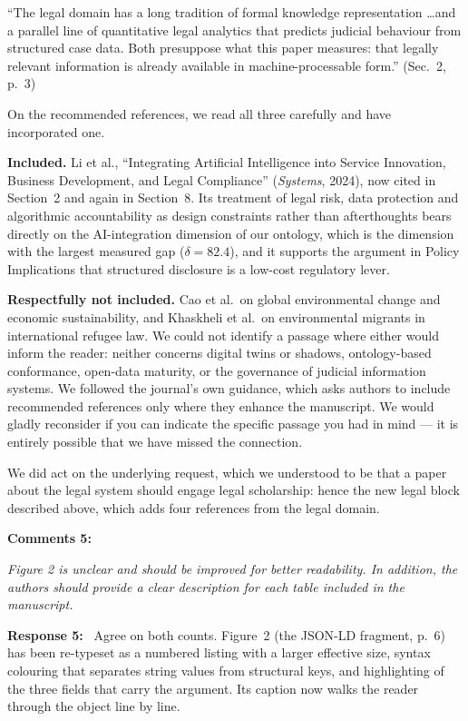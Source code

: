 \documentclass[10pt,a4paper]{article}
\newcommand{\rev}[1]{\textcolor{revred}{#1}}
\newenvironment{revcomment}
  {\begin{mdframed}[backgroundcolor=cmtbg, linecolor=cmtrule, linewidth=0.5pt,
     innertopmargin=5pt, innerbottommargin=5pt, innerleftmargin=7pt,
     innerrightmargin=7pt, skipabove=5pt, skipbelow=5pt]\small\itshape}
  {\end{mdframed}}
\newcommand{\cmt}[2]{\noindent\textbf{Comments #1:}\begin{revcomment}#2\end{revcomment}}
\newcommand{\rsp}[1]{\noindent\textbf{Response #1:}\ }
\begin{document}
\rev{``The legal domain has a long tradition of formal knowledge representation \dots and a parallel line of quantitative legal analytics that predicts judicial behaviour from structured case data. Both presuppose what this paper measures: that legally relevant information is already available in machine-processable form.''} (Sec.~2, p.~3)

On the recommended references, we read all three carefully and have incorporated one.

\textbf{Included.} Li et al., ``Integrating Artificial Intelligence into Service Innovation, Business Development, and Legal Compliance'' (\emph{Systems}, 2024), now cited in Section~2 and again in Section~8. Its treatment of legal risk, data protection and algorithmic accountability as design constraints rather than afterthoughts bears directly on the AI-integration dimension of our ontology, which is the dimension with the largest measured gap ($\delta=82.4$), and it supports the argument in Policy Implications that structured disclosure is a low-cost regulatory lever.

\textbf{Respectfully not included.} Cao et al.\ on global environmental change and economic sustainability, and Khaskheli et al.\ on environmental migrants in international refugee law. We could not identify a passage where either would inform the reader: neither concerns digital twins or shadows, ontology-based conformance, open-data maturity, or the governance of judicial information systems. We followed the journal's own guidance, which asks authors to include recommended references only where they enhance the manuscript. We would gladly reconsider if you can indicate the specific passage you had in mind --- it is entirely possible that we have missed the connection.

We did act on the underlying request, which we understood to be that a paper about the legal system should engage legal scholarship: hence the new legal block described above, which adds four references from the legal domain.

\cmt{5}{Figure 2 is unclear and should be improved for better readability. In addition, the authors should provide a clear description for each table included in the manuscript.}
\rsp{5} Agree on both counts. Figure~2 (the JSON-LD fragment, p.~6) has been re-typeset as a numbered listing with a larger effective size, syntax colouring that separates string values from structural keys, and highlighting of the three fields that carry the argument. Its caption now walks the reader through the object line by line.
\end{document}
